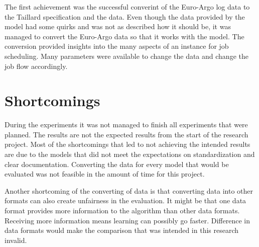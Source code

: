 

The first achievement was the successful converint of the Euro-Argo log
data to the Taillard specification and the \DAG data. Even though the \DAG
data provided by the \mrlco model had some quirks and was not as described how
it should be, it was managed to convert the Euro-Argo data so that it works with the
\mrlco model. The conversion provided insights into the many aspects of an
instance for job scheduling. Many parameters were available to change the \DAG
data and change the job flow accordingly.


\section{Shortcomings}

During the experiments it was not managed to finish all experiments that were
planned. The results are not the expected results from the start of the
research project. Most of the shortcomings that led to not achieving the
intended results are due to the models that did not meet the expectations on
standardization and clear documentation. Converting the data for every model
that would be evaluated was not feasible in the amount of time for this
project.

Another shortcoming of the converting of data is that converting data into
other formats can also create unfairness in the evaluation. It might be that
one data format provides more information to the algorithm than other data
formats. Receiving more information means learning can possibly go faster.
Difference in data formats would make the comparison that was intended in this
research invalid.

